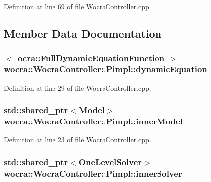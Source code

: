 Definition at line 69 of file Wocra\+Controller.\+cpp.



\subsection{Member Data Documentation}
\subsubsection[{\texorpdfstring{dynamic\+Equation}{dynamicEquation}}]{$<$ {\bf ocra\+::\+Full\+Dynamic\+Equation\+Function} $>$ wocra\+::\+Wocra\+Controller\+::\+Pimpl\+::dynamic\+Equation}\hypertarget{structwocra_1_1WocraController_1_1Pimpl_a1109652d5d4a11542cc5130713977b73}{}\label{structwocra_1_1WocraController_1_1Pimpl_a1109652d5d4a11542cc5130713977b73}


Definition at line 29 of file Wocra\+Controller.\+cpp.

\subsubsection[{\texorpdfstring{inner\+Model}{innerModel}}]{\setlength{\rightskip}{0pt plus 5cm}std\+::shared\+\_\+ptr$<${\bf Model}$>$ wocra\+::\+Wocra\+Controller\+::\+Pimpl\+::inner\+Model}\hypertarget{structwocra_1_1WocraController_1_1Pimpl_a4fe5b4fd5e927bbf9c83bf10ffafc98f}{}\label{structwocra_1_1WocraController_1_1Pimpl_a4fe5b4fd5e927bbf9c83bf10ffafc98f}


Definition at line 23 of file Wocra\+Controller.\+cpp.

\subsubsection[{\texorpdfstring{inner\+Solver}{innerSolver}}]{\setlength{\rightskip}{0pt plus 5cm}std\+::shared\+\_\+ptr$<${\bf One\+Level\+Solver}$>$ wocra\+::\+Wocra\+Controller\+::\+Pimpl\+::inner\+Solver}\hypertarget{structwocra_1_1WocraController_1_1Pimpl_a761307f74ee3b130993d589372164b98}{}\label{structwocra_1_1WocraController_1_1Pimpl_a761307f74ee3b130993d589372164b98}


